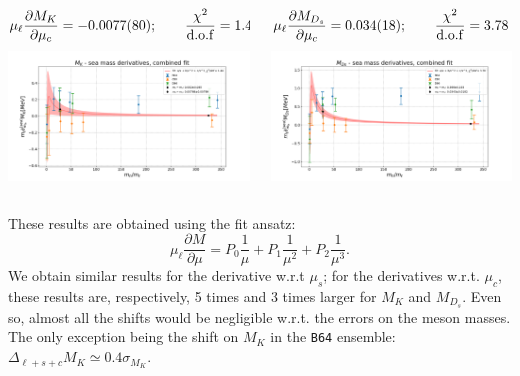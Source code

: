 \documentclass[xcolor={dvipsnames,table}]{beamer}
\begin{document}
\begin{frame}
   \begin{columns}
       \begin{column}{0.5\textwidth}
        {\small $$\mu_\ell \frac{\partial M_K}{\partial \mu_c} = -0.0077(80); \qquad\frac{\chi^2}{\rm d.o.f}= 1.44$$}
        \includegraphics[trim=0cm 0.5cm 0cm 1.3cm, clip,width=\textwidth]{plots/deco_fit_MK_der_mc_lin_term.png}
       \end{column}
       \begin{column}{0.5\textwidth}
        {\small $$\mu_\ell \frac{\partial M_{D_s}}{\partial \mu_c} = 0.034(18); \qquad\frac{\chi^2}{\rm d.o.f}= 3.78$$}
        \includegraphics[trim=0cm 0.5cm 0cm 1.3cm, clip,width=\textwidth]{plots/deco_fit_MD_der_mc_lin_term.png}
       \end{column}
   \end{columns}
   
   These results are obtained using the fit ansatz:
   \[
   \mu_\ell  \frac{\partial M }{\partial\mu} = P_0\frac{1}{\mu}+P_1\frac{1}{\mu^2}+P_2\frac{1}{\mu^3}.
   \]
   We obtain similar results for the derivative w.r.t $\mu_s$; for the derivatives w.r.t. $\mu_c$, these results are, respectively, 5 times and 3 times larger for $M_K$ and $M_{D_s}$. Even so, almost all the shifts would be negligible w.r.t. the errors on the meson masses. The only exception being the shift on $M_K$ in the \texttt{B64} ensemble: $\Delta_{\ell+s+c}M_K\simeq0.4\sigma_{M_K}$.
\end{frame}
\end{document}
